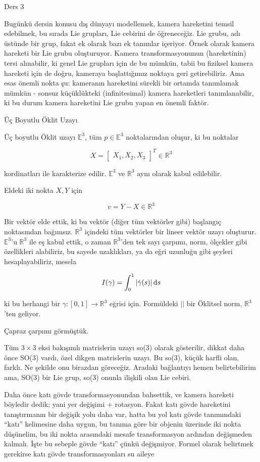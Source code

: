 \documentclass[12pt,fleqn]{article}\usepackage{../../common}
\begin{document}
Ders 3

Bugünkü dersin konusu dış dünyayı modellemek, kamera hareketini temsil
edebilmek, bu sırada Lie grupları, Lie cebirini de öğreneceğiz. Lie grubu,
adı üstünde bir grup, fakat ek olarak bazı ek tanımlar içeriyor. Örnek
olarak kamera hareketi bir Lie grubu oluşturuyor. Kamera transformasyonunun
(hareketinin) tersi alınabilir, ki genel Lie grupları için de bu mümkün,
tabii bu fiziksel kamera hareketi için de doğru, kameraya başlattığımız
noktaya geri getirebiliriz. Ama esas önemli nokta şu: kameranın hareketini
sürekli bir ortamda tanımlamak mümkün - sonsuz küçüklükteki (infinitesimal)
kamera hareketleri tanımlanabilir, ki bu durum kamera hareketini Lie grubu
yapan en önemli faktör.

Üç Boyutlu Öklit Uzayı

Üç boyutlu Öklit uzayı $\mathbb{E}^3$, tüm $p \in \mathbb{E}^3$ noktalarından oluşur, ki bu noktalar

$$ X = \left[\begin{array}{ccc} X_1,X_2,X_3 \end{array}\right]^T \in \mathbb{R}^3$$

kordinatları ile karakterize edilir. $\mathbb{E}^3$ ve $\mathbb{R}^3$ aynı
olarak kabul edilebilir. 

Eldeki iki nokta $X,Y$ için

$$ v = Y - X \in \mathbb{R}^3$$

Bir vektör elde ettik, ki bu vektör (diğer tüm vektörler gibi) başlangıç
noktasından bağımsız. $\mathbb{R}^3$ içindeki tüm vektörler bir lineer
vektör uzayı oluşturur. $\mathbb{E}^3$'u $\mathbb{R}^3$ ile eş kabul ettik,
o zaman $\mathbb{R}^3$'den tek sayı çarpımı, norm, ölçekler gibi
özellikleri alabiliriz, bu sayede uzaklıkları, ya da eğri uzunluğu gibi
şeyleri hesaplayabiliriz, mesela 

$$ I(\gamma) = \int_{0}^{1} | \dot{\gamma}(s)| \,\mathrm{d} s $$

ki bu herhangi bir $\gamma: [0,1] \to \mathbb{R}^3$ eğrisi için. Formüldeki $||$
bir Öklitsel norm, $\mathbb{R}^3$'ten geliyor.

Çapraz çarpımı görmüştük.

Tüm $3 \times 3$ eksi bakışımlı matrislerin uzayı so(3) olarak gösterilir,
dikkat daha önce SO(3) vardı, özel dikgen matrislerin uzayı. Bu so(3),
küçük harfli olan, farklı. Ne şekilde onu birazdan göreceğiz. Aradaki
bağlantıyı hemen belirtebilirim ama, SO(3) bir Lie grup, so(3) onunla
ilişkili olan Lie cebiri. 

Daha önce katı gövde transformasyonundan bahsettik, ve kamera hareketi
böyledir dedik; yani yer değişimi + rotasyon. Fakat katı gövde hareketini
tanıştırmanın bir değişik yolu daha var, hatta bu yol katı gövde
tanımındaki ``katı'' kelimesine daha uygun, bu tanıma göre bir objenin
üzerinde iki nokta düşünelim, bu iki nokta arasındaki mesafe transformasyon
ardından değişmeden kalmalı. İşte bu sebeple gövde ``katı'' çünkü
değişmiyor. Formel olarak belirtmek gerekirse katı gövde transformasyonları
su aileye
\end{document}
